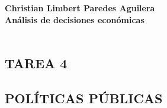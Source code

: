 \textbf{\bfseries Christian Limbert Paredes Aguilera}\\
\textbf{Análisis de decisiones económicas}\\\\
\subsection*{\center TAREA 4}
\vspace{.4cm}
\subsection*{\center POLÍTICAS PÚBLICAS}
\vspace{1cm}


\begin{enumerate}[\bfseries 1.]


\end{enumerate}
